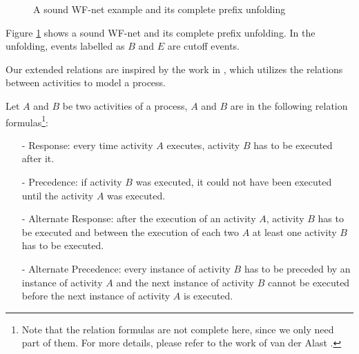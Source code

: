 \documentclass[dvips,...]{llncs}
\begin{document}
\begin{figure}[htbp]
\centering
{}
\caption{A sound WF-net example and its complete prefix unfolding\label{fig:examplePetriAndCpu}}
\end{figure}

\begin{example}\label{ex:petriAndCpu}
Figure \ref{fig:examplePetriAndCpu} shows a sound WF-net and its complete prefix unfolding. In the unfolding, events labelled as $B$ and $E$ are cutoff events.
\end{example}

Our extended relations are inspired by the work in \cite{van2006decserflow}, which utilizes the relations between activities to model a process.
\begin{definition}\label{def:relationFormulas}
Let $A$ and $B$ be two activities of a process, $A$ and $B$ are in the following relation formulas\footnote{Note that the relation formulas are not complete here, since we only need part of them. For more details, please refer to the work of van der Alast \cite{van2006decserflow}.}:
	\begin{itemize}
		\item[-] Response: every time activity $A$ executes, activity $B$ has to be executed after it.
		\item[-] Precedence: if activity $B$ was executed, it could not have been executed until the activity $A$ was executed.
		\item[-] Alternate Response: after the execution of an activity $A$, activity $B$ has to be executed and between the execution of each two $A$ at least one activity $B$ has to be executed.
		\item[-] Alternate Precedence: every instance of activity $B$ has to be preceded by an instance of activity $A$ and the next instance of activity $B$ cannot be executed before the next instance of activity $A$ is executed.
	\end{itemize}
\end{definition}
\end{document}
